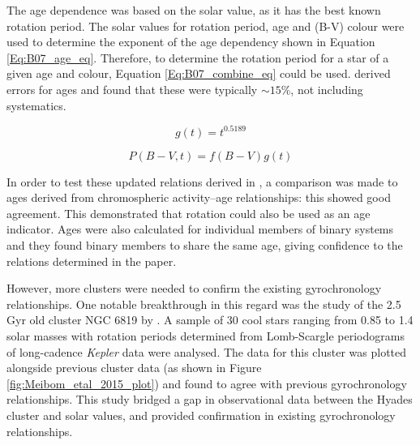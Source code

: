 The age dependence was based on the solar value, as it has the best known rotation period. The solar values for rotation period, age and (B-V) colour were used to determine the exponent of the age dependency shown in Equation \ref{Eq:B07_age_eq}. Therefore, to determine the rotation period for a star of a given age and colour, Equation \ref{Eq:B07_combine_eq} could be used. \citet{Barnes_2007} derived errors for ages and found that these were typically $\sim 15$\%, not including systematics.

\begin{equation}
   g(t) = t^{0.5189}
    \label{Eq:B07_age_eq}
\end{equation}

\begin{equation}
    P(B-V, t) = f(B-V)g(t)
    \label{Eq:B07_combine_eq}
\end{equation}

In order to test these updated relations derived in \citet{Barnes_2007}, a comparison was made to ages derived from chromospheric activity--age relationships: this showed good agreement. This demonstrated that rotation could also be used as an age indicator. Ages were also calculated for individual members of binary systems and they found binary members to share the same age, giving confidence to the relations determined in the paper.

However, more clusters were needed to confirm the existing gyrochronology relationships. One notable breakthrough in this regard was the study of the 2.5 Gyr old cluster NGC 6819 by \citet{Meibom_etal_2015}. A sample of 30 cool stars ranging from 0.85 to 1.4 solar masses with rotation periods determined from Lomb-Scargle periodograms of long-cadence \textit{Kepler} data were analysed. The data for this cluster was plotted alongside previous cluster data (as shown in Figure \ref{fig:Meibom_etal_2015_plot}) and found to agree with previous gyrochronology relationships. This study bridged a gap in observational data between the Hyades cluster and solar values, and provided confirmation in existing gyrochronology relationships.

